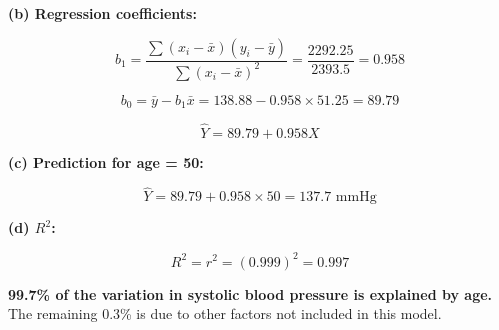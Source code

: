 \documentclass[
  12pt,
  letterpaper,
]{book}
\begin{document}
\begin{tcolorbox}
\textbf{(b) Regression coefficients:}

\[b_1 = \frac{\sum(x_i-\bar{x})(y_i-\bar{y})}{\sum(x_i-\bar{x})^2}
      = \frac{2292.25}
             {2393.5}
      = 0.958\]

\[b_0 = \bar{y} - b_1\bar{x}
      = 138.88 - 0.958 \times 51.25
      = 89.79\]

\[\boxed{\hat{Y} = 89.79 + 0.958 X}\]

\textbf{(c) Prediction for age = 50:}

\[\hat{Y} = 89.79 + 0.958 \times 50
          = 137.7 \text{ mmHg}\]

\textbf{(d) \(R^2\):}

\[R^2 = r^2 = (0.999)^2 = 0.997\]

\textbf{99.7\% of the variation in systolic blood pressure is explained
by age.} The remaining 0.3\% is due to other factors not included in
this model.

\end{tcolorbox}
\end{document}
